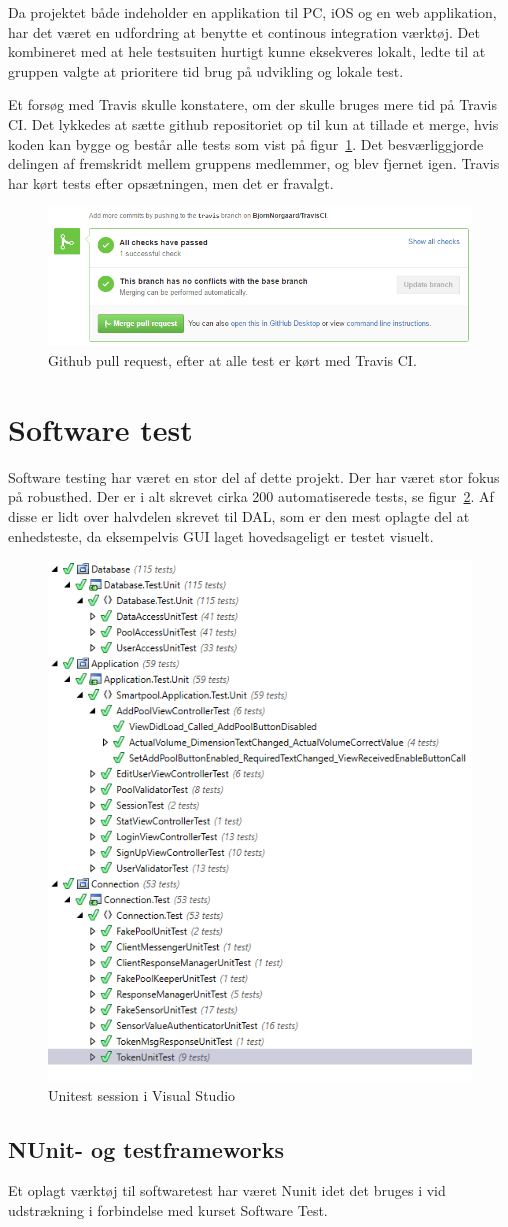 Da projektet både indeholder en applikation til PC, iOS og en web applikation, har det været en udfordring at benytte et continous integration værktøj.
Det kombineret med at hele testsuiten hurtigt kunne eksekveres lokalt, ledte til at gruppen valgte at prioritere tid brug på udvikling og lokale test.

Et forsøg med Travis skulle konstatere, om der skulle bruges mere tid på Travis CI. 
Det lykkedes at sætte github repositoriet op til kun at tillade et merge, hvis koden kan bygge og består alle tests som vist på figur~\ref{fig:travisgithubsuccess}.
Det besværliggjorde delingen af fremskridt mellem gruppens medlemmer, og blev fjernet igen.
Travis har kørt tests efter opsætningen, men det er fravalgt.

\begin{figure}[h]
	\centering
	\includegraphics[width=0.8\linewidth]{figs/processProjektGennemforsel/travis/travisgithubsuccess}
	\caption{Github pull request, efter at alle test er kørt med Travis CI.}
	\label{fig:travisgithubsuccess}
\end{figure}

\section{Software test}
Software testing har været en stor del af dette projekt. Der har været stor fokus på robusthed. Der er i alt skrevet cirka 200 automatiserede tests, se figur~\ref{fig:vsUnittest}. Af disse er lidt over halvdelen skrevet til DAL, som er den mest oplagte del at enhedsteste, da eksempelvis GUI laget hovedsageligt er testet visuelt.

\begin{figure}[h]
	\centering
	\includegraphics[width=0.5\linewidth]{figs/processProjektGennemforsel/vsUnittest}
	\caption{Unitest session i Visual Studio}
	\label{fig:vsUnittest}
\end{figure}

\subsection{NUnit- og testframeworks}
Et oplagt værktøj til softwaretest har været Nunit idet det bruges i vid udstrækning i forbindelse med kurset Software Test.